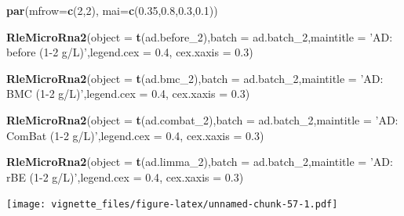 \documentclass[]{book}
\newenvironment{Shaded}{\begin{snugshade}}{\end{snugshade}}
\newcommand{\KeywordTok}[1]{\textcolor[rgb]{0.13,0.29,0.53}{\textbf{#1}}}
\newcommand{\DataTypeTok}[1]{\textcolor[rgb]{0.13,0.29,0.53}{#1}}
\newcommand{\DecValTok}[1]{\textcolor[rgb]{0.00,0.00,0.81}{#1}}
\newcommand{\FloatTok}[1]{\textcolor[rgb]{0.00,0.00,0.81}{#1}}
\newcommand{\StringTok}[1]{\textcolor[rgb]{0.31,0.60,0.02}{#1}}
\newcommand{\NormalTok}[1]{#1}
\begin{document}
\begin{Shaded}
\begin{Highlighting}[]
\KeywordTok{par}\NormalTok{(}\DataTypeTok{mfrow=}\KeywordTok{c}\NormalTok{(}\DecValTok{2}\NormalTok{,}\DecValTok{2}\NormalTok{), }\DataTypeTok{mai=}\KeywordTok{c}\NormalTok{(}\FloatTok{0.35}\NormalTok{,}\FloatTok{0.8}\NormalTok{,}\FloatTok{0.3}\NormalTok{,}\FloatTok{0.1}\NormalTok{))}

\KeywordTok{RleMicroRna2}\NormalTok{(}\DataTypeTok{object =} \KeywordTok{t}\NormalTok{(ad.before_}\DecValTok{2}\NormalTok{),}\DataTypeTok{batch =}\NormalTok{ ad.batch_}\DecValTok{2}\NormalTok{,}\DataTypeTok{maintitle =} \StringTok{'AD: before (1-2 g/L)'}\NormalTok{,}\DataTypeTok{legend.cex =} \FloatTok{0.4}\NormalTok{, }\DataTypeTok{cex.xaxis =} \FloatTok{0.3}\NormalTok{)}

\KeywordTok{RleMicroRna2}\NormalTok{(}\DataTypeTok{object =} \KeywordTok{t}\NormalTok{(ad.bmc_}\DecValTok{2}\NormalTok{),}\DataTypeTok{batch =}\NormalTok{ ad.batch_}\DecValTok{2}\NormalTok{,}\DataTypeTok{maintitle =} \StringTok{'AD: BMC (1-2 g/L)'}\NormalTok{,}\DataTypeTok{legend.cex =} \FloatTok{0.4}\NormalTok{, }\DataTypeTok{cex.xaxis =} \FloatTok{0.3}\NormalTok{)}

\KeywordTok{RleMicroRna2}\NormalTok{(}\DataTypeTok{object =} \KeywordTok{t}\NormalTok{(ad.combat_}\DecValTok{2}\NormalTok{),}\DataTypeTok{batch =}\NormalTok{ ad.batch_}\DecValTok{2}\NormalTok{,}\DataTypeTok{maintitle =} \StringTok{'AD: ComBat (1-2 g/L)'}\NormalTok{,}\DataTypeTok{legend.cex =} \FloatTok{0.4}\NormalTok{, }\DataTypeTok{cex.xaxis =} \FloatTok{0.3}\NormalTok{)}

\KeywordTok{RleMicroRna2}\NormalTok{(}\DataTypeTok{object =} \KeywordTok{t}\NormalTok{(ad.limma_}\DecValTok{2}\NormalTok{),}\DataTypeTok{batch =}\NormalTok{ ad.batch_}\DecValTok{2}\NormalTok{,}\DataTypeTok{maintitle =} \StringTok{'AD: rBE (1-2 g/L)'}\NormalTok{,}\DataTypeTok{legend.cex =} \FloatTok{0.4}\NormalTok{, }\DataTypeTok{cex.xaxis =} \FloatTok{0.3}\NormalTok{)}
\end{Highlighting}
\end{Shaded}

\texttt{[image: vignette\_files/figure-latex/unnamed-chunk-57-1.pdf]}
\end{document}
